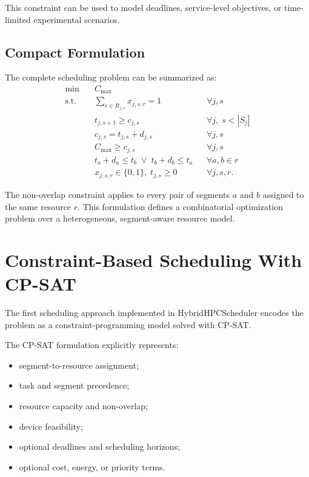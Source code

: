 \documentclass[conference]{IEEEtran}
\begin{document}
This constraint can be used to model deadlines, service-level objectives, or
time-limited experimental scenarios.

\subsection{Compact Formulation}
The complete scheduling problem can be summarized as:
\begin{equation}
\begin{aligned}
\min \quad & C_{\max} \\
\text{s.t.} \quad
& \sum_{r \in R_{j,s}} x_{j,s,r} = 1
&& \forall j,s \\
& t_{j,s+1} \geq c_{j,s}
&& \forall j,\; s < |S_j| \\
& c_{j,s} = t_{j,s} + d_{j,s}
&& \forall j,s \\
& C_{\max} \geq c_{j,s}
&& \forall j,s \\
& t_a + d_a \leq t_b \;\lor\; t_b + d_b \leq t_a
&& \forall a,b \in r \\
& x_{j,s,r} \in \{0,1\},\; t_{j,s} \geq 0
&& \forall j,s,r.
\end{aligned}
\end{equation}

The non-overlap constraint applies to every pair of segments \(a\) and \(b\)
assigned to the same resource \(r\). This formulation defines a combinatorial
optimization problem over a heterogeneous, segment-aware resource model.

\section{Constraint-Based Scheduling With CP-SAT}
The first scheduling approach implemented in HybridHPCScheduler encodes the
problem as a constraint-programming model solved with CP-SAT.

The CP-SAT formulation explicitly represents:
\begin{itemize}
    \item segment-to-resource assignment;
    \item task and segment precedence;
    \item resource capacity and non-overlap;
    \item device feasibility;
    \item optional deadlines and scheduling horizons;
    \item optional cost, energy, or priority terms.
\end{itemize}
\end{document}
